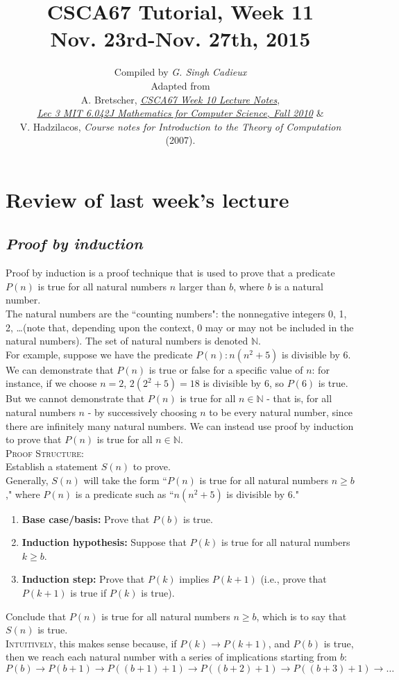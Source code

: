 \documentclass{article}
\title{\sc\LARGE CSCA67 Tutorial, Week 11\\
{\Large Nov. 23rd-Nov. 27th, 2015}}
\date{}
\author{\sc Compiled by {\em G. Singh Cadieux}\\[1ex]
\sc Adapted from\\
A. Bretscher, \href{http://www.utsc.utoronto.ca/~bretscher/a67/lectures/induction_ppt.pdf}{\em CSCA67 Week 10 Lecture Notes},\\
\href{http://youtu.be/NuGDkmwEObM?t=58m50s}{\em Lec 3 \textbar MIT 6.042J Mathematics for Computer Science, Fall 2010} \&\\
V. Hadzilacos, \textit{Course notes for {\em Introduction to the Theory of Computation}} (2007).}
\begin{document}
\maketitle

\section{\sc Review of last week's lecture}
\subsection*{\em Proof by induction}
Proof by induction is a proof technique that is used to prove that a predicate $P(n)$ is true for all natural numbers $n$ larger than $b$, where $b$ is a natural number.\\[1ex]
The natural numbers are the ``counting numbers": the nonnegative integers 0, 1, 2, \ldots (note that, depending upon the context, 0 may or may not be included in the natural numbers). The set of natural numbers is denoted $\mathbb{N}$.\\[1ex]
For example, suppose we have the predicate $P(n): n(n^2+5)$ is divisible by 6.\\
We can demonstrate that $P(n)$ is true or false for a specific value of $n$: for instance, if we choose $n=2$, $2(2^2+5)=18$ is divisible by 6, so $P(6)$ is true.\\
But we cannot demonstrate that $P(n)$ is true for all $n\in\mathbb{N}$ - that is, for all natural numbers $n$ - by successively choosing $n$ to be every natural number, since there are infinitely many natural numbers. We can instead use proof by induction to prove that $P(n)$ is true for all $n\in\mathbb{N}$.\\[1em]
\textsc{Proof Structure:}\\[1ex]
Establish a statement $S(n)$ to prove.\\
Generally, $S(n)$ will take the form ``$P(n)$ is true for all natural numbers $n\geq b$," where $P(n)$ is a predicate such as ``$n(n^2+5)$ is divisible by 6."
\begin{enumerate}
\item \textbf{Base case/basis:} Prove that $P(b)$ is true.
\item \textbf{Induction hypothesis:} Suppose that $P(k)$ is true for all natural numbers $k\geq b$.
\item \textbf{Induction step:} Prove that $P(k)$ implies $P(k+1)$ (i.e., prove that $P(k+1)$ is true if $P(k)$ is true).
\end{enumerate}
Conclude that $P(n)$ is true for all natural numbers $n\geq b$, which is to say that $S(n)$ is true.\\[1em]
\textsc{Intuitively}, this makes sense because, if $P(k)\to P(k+1)$, and $P(b)$ is true, then we reach each natural number with a series of implications starting from $b$:
\begin{equation*}
P(b)\to P(b+1)\to P((b+1)+1)\to P((b+2)+1)\to P((b+3)+1)\to\ldots
\end{equation*}
\end{document}
